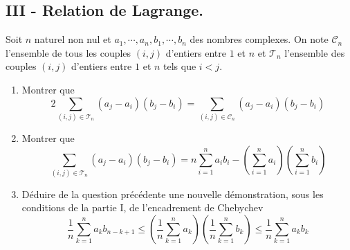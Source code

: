 \subsection*{III - Relation de Lagrange.}
Soit $n$ naturel non nul et $a_1,\cdots, a_n,b_1,\cdots, b_n$ des nombres complexes. On note $\mathcal{C}_n$ l'ensemble de tous les couples $(i,j)$ d'entiers entre $1$ et $n$ et $\mathcal{T}_n$ l'ensemble des couples $(i,j)$ d'entiers entre $1$ et $n$ tels que $i<j$.
\begin{enumerate}
 \item Montrer que
\begin{displaymath}
 2\sum_{(i,j)\in \mathcal{T}_n}(a_j-a_i)(b_j-b_i)
=
\sum_{(i,j)\in \mathcal{C}_n}(a_j-a_i)(b_j-b_i)
\end{displaymath}
\item Montrer que
\begin{displaymath}
 \sum_{(i,j)\in \mathcal{T}_n}(a_j-a_i)(b_j-b_i)
=
n\sum_{i=1}^n a_i b_i - \left(\sum_{i=1}^n a_i\right)\left(\sum_{i=1}^n b_i\right) 
\end{displaymath}
\item Déduire de la question précédente une nouvelle démonstration, sous les conditions de la partie I, de l'encadrement de Chebychev
\begin{displaymath}
 \frac{1}{n}\sum_{k=1}^{n}a_k b_{n-k+1} \leq 
\left( \frac{1}{n}\sum_{k=1}^{n}a_k\right) 
\left( \frac{1}{n}\sum_{k=1}^{n}b_k\right)
\leq  \frac{1}{n}\sum_{k=1}^{n}a_k b_{k}
\end{displaymath}

\end{enumerate}

 


